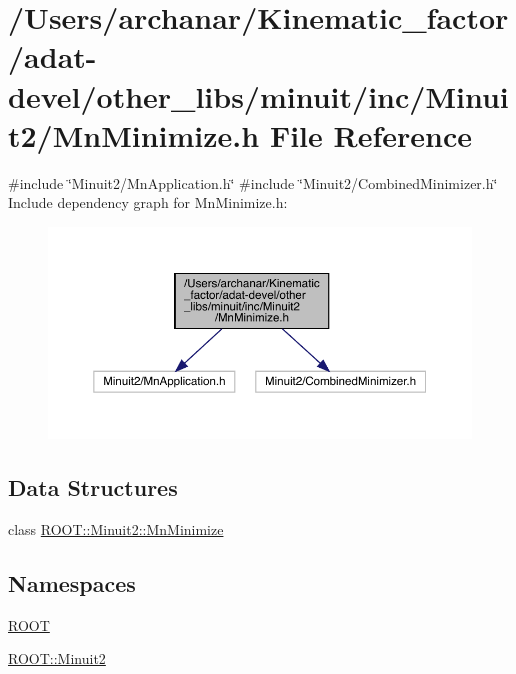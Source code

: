 \hypertarget{adat-devel_2other__libs_2minuit_2inc_2Minuit2_2MnMinimize_8h}{}\section{/\+Users/archanar/\+Kinematic\+\_\+factor/adat-\/devel/other\+\_\+libs/minuit/inc/\+Minuit2/\+Mn\+Minimize.h File Reference}
\label{adat-devel_2other__libs_2minuit_2inc_2Minuit2_2MnMinimize_8h}
{\ttfamily \#include \char`\"{}Minuit2/\+Mn\+Application.\+h\char`\"{}}\newline
{\ttfamily \#include \char`\"{}Minuit2/\+Combined\+Minimizer.\+h\char`\"{}}\newline
Include dependency graph for Mn\+Minimize.\+h\+:
\nopagebreak
\begin{figure}[H]
\begin{center}
\leavevmode
\includegraphics[width=350pt]{d8/dea/adat-devel_2other__libs_2minuit_2inc_2Minuit2_2MnMinimize_8h__incl}
\end{center}
\end{figure}
\subsection*{Data Structures}
\begin{DoxyCompactItemize}
\item 
class \mbox{\hyperlink{classROOT_1_1Minuit2_1_1MnMinimize}{R\+O\+O\+T\+::\+Minuit2\+::\+Mn\+Minimize}}
\end{DoxyCompactItemize}
\subsection*{Namespaces}
\begin{DoxyCompactItemize}
\item 
 \mbox{\hyperlink{namespaceROOT}{R\+O\+OT}}
\item 
 \mbox{\hyperlink{namespaceROOT_1_1Minuit2}{R\+O\+O\+T\+::\+Minuit2}}
\end{DoxyCompactItemize}
